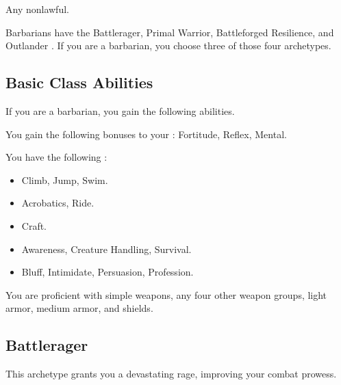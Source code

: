      Any nonlawful.

     Barbarians have the Battlerager, Primal Warrior, Battleforged Resilience, and Outlander .
    If you are a barbarian, you choose three of those four archetypes.

    \subsection{Basic Class Abilities}
        If you are a barbarian, you gain the following abilities.

        You gain the following bonuses to your :  Fortitude,  Reflex,  Mental.

        You have the following :
        \begin{itemize}
            \item {} Climb, Jump, Swim.
            \item {} Acrobatics, Ride.
            \item {} Craft.
            \item {} Awareness, Creature Handling, Survival.
            \item {} Bluff, Intimidate, Persuasion, Profession.
        \end{itemize}

        You are proficient with simple weapons, any four other weapon groups, light armor, medium armor, and shields.

    \subsection{Battlerager}\label{Rage}
        This archetype grants you a devastating rage, improving your combat prowess.

